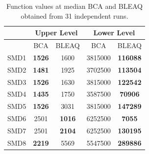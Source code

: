 \documentclass[conference]{IEEEtran}
\begin{document}
\begin{table}[!t]
\renewcommand{\arraystretch}{1.3}
    \caption{Function values at median BCA and BLEAQ obtained from 31 independent runs.}
    \label{tab:leader2}
    \centering
    \begin{tabular}{|c|c|c||c|c|}
\hline
& \multicolumn{2}{c||}{Upper Level} & \multicolumn{2}{c|}{Lower Level} \\ \hline
& BCA & BLEAQ & BCA & BLEAQ \\ \hline
SMD1 & \textbf{1526} & 1600 & 3815000 & \textbf{116088} \\ \hline
SMD2 & \textbf{1481} & 1925 & 3702500 & \textbf{113504} \\ \hline
SMD3 & \textbf{1526} & 1630 & 3815000 & \textbf{122542} \\ \hline
SMD4 & \textbf{1435} & 1750 & 3587500 & \textbf{70906} \\ \hline
SMD5 & \textbf{1526} & 3031 & 3815000 & \textbf{147289} \\ \hline
SMD6 &     2501      & \textbf{1016} & 6252500 & \textbf{7055} \\ \hline
SMD7 &     2501      & \textbf{2104} & 6252500 & \textbf{130195} \\ \hline
SMD8 & \textbf{2219} & 5569 & 5547500 & \textbf{289886} \\ \hline
    \end{tabular}
\end{table}
\end{document}
